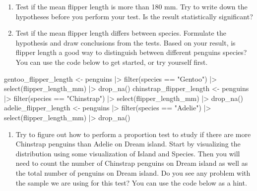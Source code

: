 \documentclass[
  letterpaper,
  DIV=11,
  numbers=noendperiod]{scrreprt}
\newenvironment{Shaded}{\begin{snugshade}}{\end{snugshade}}
\newcommand{\FunctionTok}[1]{\textcolor[rgb]{0.28,0.35,0.67}{#1}}
\newcommand{\NormalTok}[1]{\textcolor[rgb]{0.00,0.23,0.31}{#1}}
\newcommand{\OtherTok}[1]{\textcolor[rgb]{0.00,0.23,0.31}{#1}}
\newcommand{\SpecialCharTok}[1]{\textcolor[rgb]{0.37,0.37,0.37}{#1}}
\newcommand{\StringTok}[1]{\textcolor[rgb]{0.13,0.47,0.30}{#1}}
\providecommand{\tightlist}{%
  \setlength{\itemsep}{0pt}\setlength{\parskip}{0pt}}\usepackage{longtable,booktabs,array}
\begin{document}
\begin{enumerate}
\def\labelenumi{\arabic{enumi}.}
\tightlist
\item
  Test if the mean flipper length is more than 180 mm. Try to write down
  the hypotheses before you perform your test. Is the result
  statistically significant?
\item
  Test if the mean flipper length differs between species. Formulate the
  hypothesis and draw conclusions from the tests. Based on your result,
  is flipper length a good way to distinguish between different penguins
  species? You can use the code below to get started, or try yourself
  first.
\end{enumerate}

\begin{Shaded}
\begin{Highlighting}[]
\NormalTok{gentoo\_flipper\_length }\OtherTok{\textless{}{-}}\NormalTok{ penguins }\SpecialCharTok{|\textgreater{}}
  \FunctionTok{filter}\NormalTok{(species }\SpecialCharTok{==} \StringTok{"Gentoo"}\NormalTok{) }\SpecialCharTok{|\textgreater{}}
  \FunctionTok{select}\NormalTok{(flipper\_length\_mm) }\SpecialCharTok{|\textgreater{}}
  \FunctionTok{drop\_na}\NormalTok{()}
\NormalTok{chinstrap\_flipper\_length }\OtherTok{\textless{}{-}}\NormalTok{ penguins }\SpecialCharTok{|\textgreater{}}
  \FunctionTok{filter}\NormalTok{(species }\SpecialCharTok{==} \StringTok{"Chinstrap"}\NormalTok{) }\SpecialCharTok{|\textgreater{}}
  \FunctionTok{select}\NormalTok{(flipper\_length\_mm) }\SpecialCharTok{|\textgreater{}}
  \FunctionTok{drop\_na}\NormalTok{()}
\NormalTok{adelie\_flipper\_length }\OtherTok{\textless{}{-}}\NormalTok{ penguins }\SpecialCharTok{|\textgreater{}}
  \FunctionTok{filter}\NormalTok{(species }\SpecialCharTok{==} \StringTok{"Adelie"}\NormalTok{) }\SpecialCharTok{|\textgreater{}}
  \FunctionTok{select}\NormalTok{(flipper\_length\_mm) }\SpecialCharTok{|\textgreater{}}
  \FunctionTok{drop\_na}\NormalTok{()}
\end{Highlighting}
\end{Shaded}

\begin{enumerate}
\def\labelenumi{\arabic{enumi}.}
\setcounter{enumi}{2}
\tightlist
\item
  Try to figure out how to perform a proportion test to study if there
  are more Chinstrap penguins than Adelie on Dream island. Start by
  visualizing the distribution using some visualization of Island and
  Species. Then you will need to count the number of Chinstrap penguins
  on Dream island as well as the total number of penguins on Dream
  island. Do you see any problem with the sample we are using for this
  test? You can use the code below as a hint.
\end{enumerate}
\end{document}
